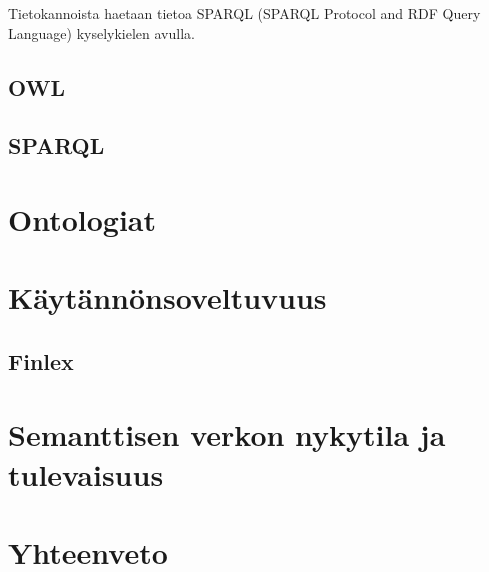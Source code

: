 \documentclass[finnish, 12pt, a4paper, elec, utf8, pdfa, online]{aaltothesis}
\begin{document}
Tietokannoista haetaan tietoa SPARQL (SPARQL Protocol and RDF Query Language) kyselykielen avulla.


\subsection{OWL}

\subsection{SPARQL}

\clearpage
\section{Ontologiat}



\clearpage
\section{Käytännönsoveltuvuus}

\subsection{Finlex}

\clearpage
\section{Semanttisen verkon nykytila ja tulevaisuus}

\clearpage
\section{Yhteenveto}



\clearpage




\end{document}
